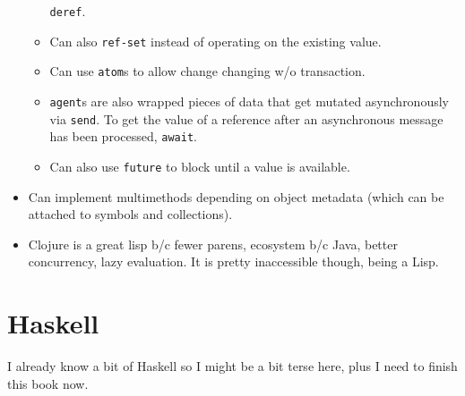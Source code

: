 \documentclass[10pt]{article}
\begin{document}
\begin{itemize}
\begin{itemize}
                \lstinline{deref}.
            \item Can also \lstinline{ref-set} instead of operating on the
                existing value.
            \item Can use \lstinline{atom}s to allow change changing w/o
                transaction.
            \item \lstinline{agent}s are also wrapped pieces of data that get
                mutated asynchronously via \lstinline{send}. To get the value of
                a reference after an asynchronous message has been processed,
                \lstinline{await}.
            \item Can also use \lstinline{future} to block until a value is
                available.
        \end{itemize}
    \item Can implement multimethods depending on object metadata (which can be
        attached to symbols and collections).
    \item Clojure is a great lisp b/c fewer parens, ecosystem b/c Java, better
        concurrency, lazy evaluation. It is pretty inaccessible though, being a
        Lisp.
\end{itemize}

\section{Haskell}

I already know a bit of Haskell so I might be a bit terse here, plus I need to
finish this book now.
\end{document}
